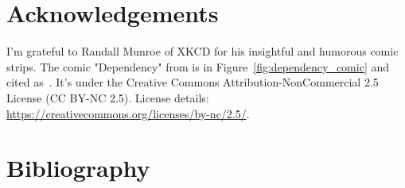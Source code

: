 \documentclass{article}
\begin{document}



\section{Acknowledgements}
I'm grateful to Randall Munroe of XKCD for his insightful and humorous comic strips. The comic "Dependency" from  is in Figure~\ref{fig:dependency_comic} and cited as~\cite{munroeDependency2020}. It's under the Creative Commons Attribution-NonCommercial 2.5 License (CC BY-NC 2.5). License details: \url{https://creativecommons.org/licenses/by-nc/2.5/}.

\section{Bibliography}
\printbibliography
\end{document}
